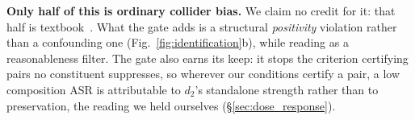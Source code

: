 \documentclass{article}
\begin{document}
\noindent \textbf{Only half of this is ordinary collider bias.} We claim no credit for it: that half is textbook~\citep{elwert2014endogenous,pearl2009causality}. What the gate adds is a structural \emph{positivity} violation rather than a confounding one (Fig.~\ref{fig:identification}b), while reading as a reasonableness filter. The gate also earns its keep: it stops the criterion certifying pairs no constituent suppresses, so wherever our conditions certify a pair, a low composition ASR is attributable to $d_2$'s standalone strength rather than to preservation, the reading we held ourselves (§\ref{sec:dose_response}).
\end{document}
